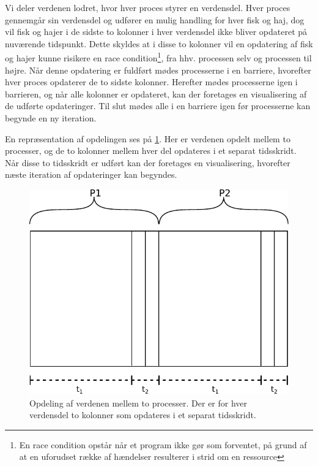 Vi deler verdenen lodret, hvor hver proces styrer en verdensdel. Hver proces 
gennemgår sin verdensdel og udfører en mulig handling for hver fisk og haj, dog 
vil fisk og hajer i de sidste to kolonner i hver verdensdel ikke bliver 
opdateret på nuværende tidspunkt. Dette skyldes at i disse to kolonner vil en 
opdatering af fisk og hajer kunne risikere en race 
condition\footnote{En race condition opstår når et program ikke gør som 
forventet, på grund af at en uforudset række af hændelser resulterer i strid om 
en ressource}, fra hhv.  processen selv og processen til højre.
 Når denne opdatering er fuldført mødes processerne i en barriere, hvorefter 
 hver proces opdaterer de to sidste kolonner. Herefter mødes processerne igen i 
 barrieren, og når alle kolonner er opdateret, kan der foretages en 
 visualisering af de udførte opdateringer. Til slut mødes alle i en barriere 
 igen før processerne kan begynde en ny iteration.

En repræsentation af opdelingen ses på \cref{fig:wator}. Her er verdenen 
opdelt mellem to processer, og de to kolonner mellem hver del opdateres i et 
separat tidsskridt. Når disse to tidsskridt er udført kan der foretages en 
visualisering, hvorefter næste iteration af opdateringer kan begyndes. 
\begin{figure}[hbtp] \begin{center}
  \includegraphics[scale=0.75]{images/wator}
  \caption{Opdeling af verdenen mellem to processer. Der er for hver verdensdel 
  to kolonner som opdateres i et separat tidsskridt.}
  \label{fig:wator}
  \end{center}
\end{figure}

